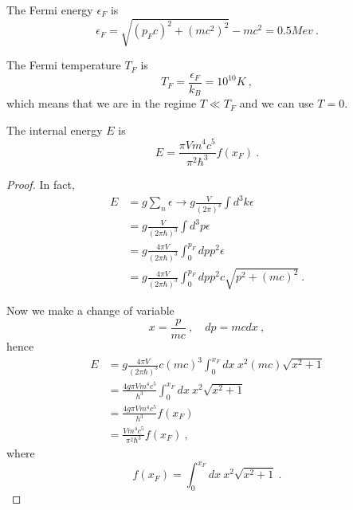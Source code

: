     The Fermi energy $\epsilon_F$ is 
    \begin{equation*}
        \epsilon_F = \sqrt{(p_F c)^2 + (mc^2)^2} - mc^2 = 0.5 Mev ~.
    \end{equation*}

    The Fermi temperature $T_F$ is 
    \begin{equation*}
        T_F = \frac{\epsilon_F}{k_B} = 10^{10} K ~,
    \end{equation*}
    which means that we are in the regime $T \ll T_F$ and we can use $T=0$.

    The internal energy $E$ is 
    \begin{equation*}
        E = \frac{\pi V m^4 c^5}{\pi^2 \hbar^3} f(x_F) ~.
    \end{equation*}
    \begin{proof}
        In fact,
        \begin{equation*}
        \begin{aligned}
            E & = g \sum_{n} \epsilon \rightarrow g \frac{V}{(2\pi)^3} \int d^3 k \epsilon \\ & = g \frac{V}{(2\pi \hbar)^3} \int d^3 p \epsilon \\ & = g \frac{4 \pi V}{(2\pi \hbar)^3} \int_0^{p_F} dp p^2 \epsilon \\ & = g \frac{4 \pi V}{(2\pi \hbar)^3} \int_0^{p_F} dp p^2 c \sqrt{p^2 + (mc)^2} ~.
        \end{aligned}
        \end{equation*}

        Now we make a change of variable 
        \begin{equation*}
            x = \frac{p}{mc} ~, \quad dp = mc dx ~,
        \end{equation*}
        hence 
        \begin{equation*}
        \begin{aligned}
            E & = g \frac{4 \pi V}{(2\pi \hbar)^3} c (mc)^3 \int_0^{x_F} dx ~ x^2 (mc)\sqrt{x^2 + 1} \\ & =  \frac{4 g \pi V m^4 c^5}{h^3} \int_0^{x_F} dx ~ x^2\sqrt{x^2 + 1} \\ & = \frac{4 g \pi V m^4 c^5}{h^3} f(x_F) \\ & = \frac{V m^4 c^5}{\pi^2 \hbar^3} f(x_F) ~,
        \end{aligned}
        \end{equation*}
        where 
        \begin{equation*}
            f(x_F) = \int_0^{x_F} dx ~ x^2 \sqrt{x^2 + 1} ~.
        \end{equation*}
    \end{proof}

